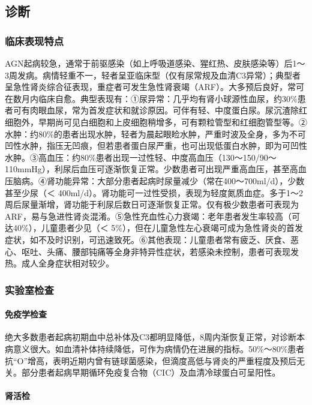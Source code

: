 \subsection{诊断}

\subsubsection{临床表现特点}

AGN起病较急，通常于前驱感染（如上呼吸道感染、猩红热、皮肤感染等）后1～3周发病。病情轻重不一，轻者呈亚临床型（仅有尿常规及血清C3异常）；典型者呈急性肾炎综合征表现，重症者可发生急性肾衰竭（ARF）。大多预后良好，常可在数月内临床自愈。典型表现有：①尿异常：几乎均有肾小球源性血尿，约30\%患者可有肉眼血尿，常为首发症状和就诊原因。可伴有轻、中度蛋白尿。尿沉渣除红细胞外，早期尚可见白细胞和上皮细胞稍增多，可有颗粒管型和红细胞管型等。②水肿：约80\%的患者出现水肿，轻者为晨起眼睑水肿，严重时波及全身，多为不可凹性水肿，指压无凹痕，但若患者蛋白尿严重，也可出现低蛋白水肿，即为可凹性水肿。③高血压：约80\%患者出现一过性轻、中度高血压（130～150/90～110mmHg），利尿后血压可逐渐恢复正常。少数患者可出现严重高血压，甚至高血压脑病。④肾功能异常：大部分患者起病时尿量减少（常在400～700ml/d），少数甚至少尿（＜
400ml/d）。肾功能可一过性受损，表现为轻度氮质血症。多于1～2周后尿量渐增，肾功能于利尿后数日可逐渐恢复正常。仅有极少数患者可表现为ARF，易与急进性肾炎混淆。⑤急性充血性心力衰竭：老年患者发生率较高（可达40\%），儿童患者少见（＜
5\%），但在儿童急性左心衰竭可成为急性肾炎的首发症状，如不及时识别，可迅速致死。⑥其他表现：儿童患者常有疲乏、厌食、恶心、呕吐、头痛、腰部钝痛等全身非特异性症状，若感染未控制，患者可表现发热。成人全身症状相对较少。

\subsubsection{实验室检查}

\paragraph{免疫学检查}

绝大多数患者起病初期血中总补体及C3都明显降低，8周内渐恢复正常，对诊断本病意义很大。如血清补体持续降低，可作为病情仍在进展的指标。50\%～80\%患者抗“O”增高，表明近期内曾有链球菌感染，但滴度高低与肾炎的严重程度及预后无关。部分患者起病早期循环免疫复合物（CIC）及血清冷球蛋白可呈阳性。

\paragraph{肾活检}

